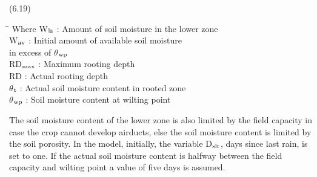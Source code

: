 \documentclass[11pt]{article}
\begin{document}
 \bigskip
\strut\hfill (6.19)
\nwln
\begin{tabbing}
\hspace{1.27cm}\=\hspace{1.27cm}\=\hspace{1.27cm}\=\hspace{1.27cm}\=%
\hspace{1.27cm}\=\hspace{1.27cm}\=\hspace{1.27cm}\=\hspace{1.27cm}\=%
\hspace{1.27cm}\=\hspace{1.27cm}\=\kill
Where\> \> W$_{{\rm lz}}$\> : Amount of soil moisture in the lower zone\> \> \> \> \> \> \> [cm]\\
\>\> W$_{{\rm av}}$\> : Initial amount of available soil moisture \\
\>\> \>   in excess of $\theta$$_{{\rm wp}}$\> \> \> \> \> \> \> [cm]\\
\>\> RD$_{{\rm max}}$\> : Maximum rooting depth\> \> \> \> \> \> \> [cm]\\
\>\> RD\> : Actual rooting depth\> \> \> \> \> \> \> [cm]\\
\>\> $\theta$$_{{\rm t}}$\> : Actual soil moisture content in rooted zone \> \> \> \> \> \> \> [cm$^{{\rm 3}}$ cm$^{{\rm -3}}$]\\
\>\> $\theta$$_{{\rm wp}}$\> : Soil moisture content at wilting point \> \> \> \> \> \> \> [cm$^{{\rm 3}}$ cm$^{{\rm -3}}$]
\end{tabbing}

\bigskip
\bigskip
\bigskip
\bigskip
\bigskip
The soil moisture content of the lower zone is also limited by the field capacity in case
the crop cannot develop airducts, else the soil moisture content is limited by the soil
porosity. In the model, initially, the variable D$_{{\rm slr}}$, days since last rain, is set to one. If the
actual soil moisture content is halfway between the field capacity and wilting point a
value of five days is assumed. 
\end{document}
